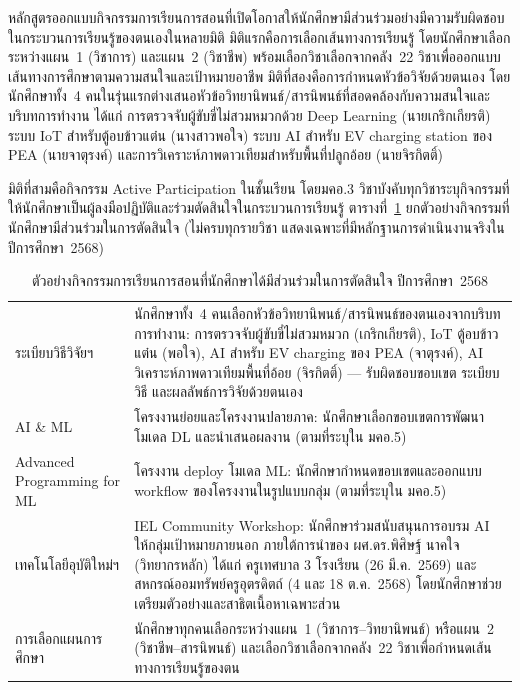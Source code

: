 หลักสูตรออกแบบกิจกรรมการเรียนการสอนที่เปิดโอกาสให้นักศึกษามีส่วนร่วมอย่างมีความรับผิดชอบในกระบวนการเรียนรู้ของตนเองในหลายมิติ มิติแรกคือการเลือกเส้นทางการเรียนรู้ โดยนักศึกษาเลือกระหว่างแผน~1 (วิชาการ) และแผน~2 (วิชาชีพ) พร้อมเลือกวิชาเลือกจากคลัง~22 วิชาเพื่อออกแบบเส้นทางการศึกษาตามความสนใจและเป้าหมายอาชีพ มิติที่สองคือการกำหนดหัวข้อวิจัยด้วยตนเอง โดยนักศึกษาทั้ง~4 คนในรุ่นแรกต่างเสนอหัวข้อวิทยานิพนธ์/สารนิพนธ์ที่สอดคล้องกับความสนใจและบริบทการทำงาน ได้แก่ การตรวจจับผู้ขับขี่ไม่สวมหมวกด้วย Deep Learning (นายเกริกเกียรติ) ระบบ IoT สำหรับตู้อบข้าวแต๋น (นางสาวพอใจ) ระบบ AI สำหรับ EV charging station ของ PEA (นายจาตุรงค์) และการวิเคราะห์ภาพดาวเทียมสำหรับพื้นที่ปลูกอ้อย (นายจิรกิตติ์)

มิติที่สามคือกิจกรรม Active Participation ในชั้นเรียน โดยมคอ.3 วิชาบังคับทุกวิชาระบุกิจกรรมที่ให้นักศึกษาเป็นผู้ลงมือปฏิบัติและร่วมตัดสินใจในกระบวนการเรียนรู้ ตารางที่~\ref{tbl:student_participation_c32} ยกตัวอย่างกิจกรรมที่นักศึกษามีส่วนร่วมในการตัดสินใจ (ไม่ครบทุกรายวิชา แสดงเฉพาะที่มีหลักฐานการดำเนินงานจริงในปีการศึกษา~2568)

\begin{table}[H]
  \centering
  \caption{ตัวอย่างกิจกรรมการเรียนการสอนที่นักศึกษาได้มีส่วนร่วมในการตัดสินใจ ปีการศึกษา~2568}
  \label{tbl:student_participation_c32}
  \begingroup
  \footnotesize
  \setlength{\tabcolsep}{4pt}
  \renewcommand{\arraystretch}{1.35}
  \begin{tabularx}{\linewidth}{|>{\raggedright\arraybackslash}p{3.2cm}|>{\raggedright\arraybackslash}X|}
    \hline
    \rowcolor{olive!60!black}
    \multicolumn{1}{|c|}{\textcolor{white}{\textbf{รายวิชา}}} & \multicolumn{1}{c|}{\textcolor{white}{\textbf{กิจกรรมการเรียนการสอนที่นักศึกษาได้มีส่วนร่วมในการตัดสินใจ}}} \\
    \hline
    7015906 ระเบียบวิธีวิจัยฯ &
    นักศึกษาทั้ง~4 คนเลือกหัวข้อวิทยานิพนธ์/สารนิพนธ์ของตนเองจากบริบทการทำงาน: การตรวจจับผู้ขับขี่ไม่สวมหมวก (เกริกเกียรติ), IoT ตู้อบข้าวแต๋น (พอใจ), AI สำหรับ EV charging ของ PEA (จาตุรงค์), AI วิเคราะห์ภาพดาวเทียมพื้นที่อ้อย (จิรกิตติ์) --- รับผิดชอบขอบเขต ระเบียบวิธี และผลลัพธ์การวิจัยด้วยตนเอง \\
    \hline
    4095101 AI \& ML &
    โครงงานย่อยและโครงงานปลายภาค: นักศึกษาเลือกขอบเขตการพัฒนาโมเดล DL และนำเสนอผลงาน (ตามที่ระบุใน มคอ.5) \\
    \hline
    4095102 Advanced Programming for ML &
    โครงงาน deploy โมเดล ML: นักศึกษากำหนดขอบเขตและออกแบบ workflow ของโครงงานในรูปแบบกลุ่ม (ตามที่ระบุใน มคอ.5) \\
    \hline
    7015101 เทคโนโลยีอุบัติใหม่ฯ &
    IEL Community Workshop: นักศึกษาร่วมสนับสนุนการอบรม AI ให้กลุ่มเป้าหมายภายนอก ภายใต้การนำของ ผศ.ดร.พิศิษฐ์ นาคใจ (วิทยากรหลัก) ได้แก่ ครูเทศบาล 3 โรงเรียน (26 มี.ค.~2569) และสหกรณ์ออมทรัพย์ครูอุตรดิตถ์ (4 และ 18 ต.ค.~2568) โดยนักศึกษาช่วยเตรียมตัวอย่างและสาธิตเนื้อหาเฉพาะส่วน \\
    \hline
    การเลือกแผนการศึกษา &
    นักศึกษาทุกคนเลือกระหว่างแผน~1 (วิชาการ--วิทยานิพนธ์) หรือแผน~2 (วิชาชีพ--สารนิพนธ์) และเลือกวิชาเลือกจากคลัง~22 วิชาเพื่อกำหนดเส้นทางการเรียนรู้ของตน \\
    \hline
  \end{tabularx}
  \endgroup
\end{table}

